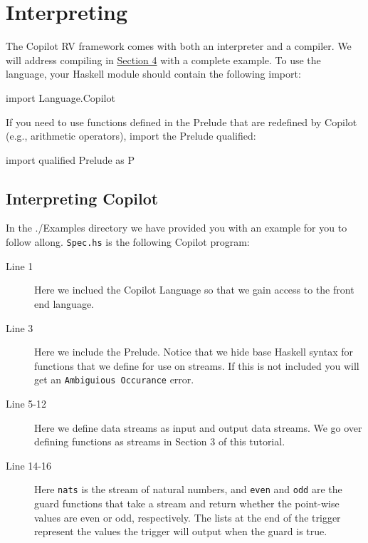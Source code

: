 \newpage 
\section{Interpreting}
\label{interpcompile}
The Copilot RV framework comes with both an interpreter and a
compiler. We will address compiling in \hyperref[sec:complete_example]{Section 4}
 with a complete example. 
\noindent To use the language, your Haskell module should contain the following import:
%
\begin{code}
import Language.Copilot
\end{code}
%
If you need to use functions defined in the Prelude that are redefined by
Copilot (e.g., arithmetic operators), import the Prelude qualified:
%
\begin{code}
import qualified Prelude as P
\end{code}

\subsection{Interpreting Copilot}
In the ./Examples directory we have provided you with an example
for you to follow allong. \texttt{Spec.hs} is the following Copilot program:
%


\begin{description}
  \item[Line 1] Here we inclued the Copilot Language so that we gain access to the
  front end language.
  \item[Line 3] Here we include the Prelude. Notice that we hide base Haskell
  syntax for functions that we define for use on streams. If this is not
  included you will get an \texttt{Ambiguious Occurance} error. 
  \item[Line 5-12] Here we define data streams as input and output data streams. We
  go over defining functions as streams in Section 3 of this tutorial. 
  \item[Line 14-16] Here {\tt nats} is the stream of natural numbers, and {\tt even} and {\tt odd}
  are the guard functions that take a stream and return whether the point-wise
  values are even or odd, respectively. The lists at the end of the trigger
  represent the values the trigger will output when the guard is true.

\end{description}

